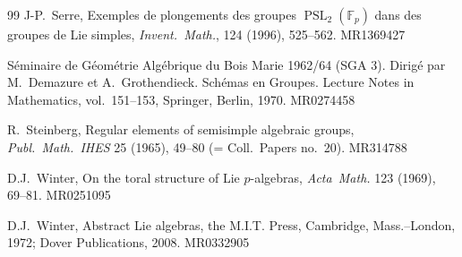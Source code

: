 \documentclass[11pt,a4paper]{article}
\theoremstyle{plain}
\theoremstyle{definition}
\DeclareMathOperator{\PSL}{PSL}
\begin{document}
\begin{thebibliography}{99}
J-P.~Serre, Exemples de plongements des groupes $\PSL_2(\mathbb{F}_p)$ dans des groupes de Lie simples, \textit{Invent.~Math.}, 124 (1996), 525--562. MR1369427

S\'eminaire de G\'eom\'etrie Alg\'ebrique du Bois Marie 1962/64 (SGA 3). Dirig\'e par M.~Demazure et A.~Grothendieck. Sch\'emas en Groupes. Lecture Notes in Mathematics, vol.~151--153, Springer, Berlin, 1970. MR0274458

R.~Steinberg, Regular elements of semisimple algebraic groups, \textit{Publ.~Math.~IHES} 25 (1965), 49--80 (= Coll.~Papers no.~20). MR314788

D.J.~Winter, On the toral structure of Lie $p$-algebras, \textit{Acta~Math.} 123 (1969), 69--81. MR0251095

D.J.~Winter, Abstract Lie algebras, the M.I.T. Press, Cambridge, Mass.--London, 1972; Dover Publications, 2008. MR0332905

\end{thebibliography}
\end{document}
